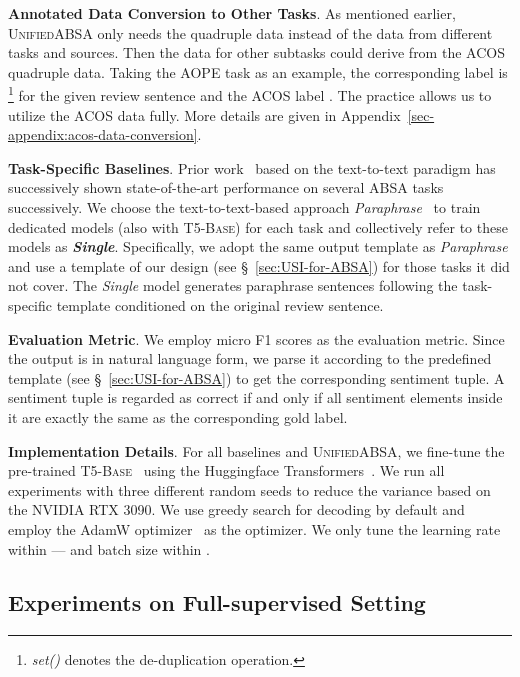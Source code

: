 \documentclass[11pt]{article}
\newcommand{\UnifiedABSA}{\textsc{UnifiedABSA}\xspace}
\newcommand{\single}{\textit{Single}\xspace}
\begin{document}
\noindent\textbf{Annotated Data Conversion to Other Tasks}. As mentioned earlier, \UnifiedABSA only needs the quadruple data instead of the data from different tasks and sources. Then the data for other subtasks could derive from the ACOS quadruple data. Taking the AOPE task as an example, the corresponding label is \footnote{\emph{set()} denotes the de-duplication operation.} for the given review sentence and the ACOS label . The practice allows us to utilize the ACOS data fully. More details are given in Appendix~\ref{sec-appendix:acos-data-conversion}.



\noindent\textbf{Task-Specific Baselines}. Prior work~\cite{zhang-etal-2021-gas,zhang-etal-2021-paraphrase} based on the text-to-text paradigm has successively shown state-of-the-art performance on several ABSA tasks successively. We choose the text-to-text-based approach \emph{Paraphrase}~\cite{zhang-etal-2021-paraphrase} to train dedicated models (also with \textsc{T5-Base}) for each task and  collectively refer to these models as \textbf{\single}. Specifically, we adopt the same output template as \emph{Paraphrase} and use a template of our design (see \S~\ref{sec:USI-for-ABSA}) for those tasks it did not cover. The \single model generates paraphrase sentences following the task-specific template conditioned on the original review sentence.



\noindent\textbf{Evaluation Metric}. We employ micro F1 scores as the evaluation metric. Since the output is in natural language form, we parse it according to the predefined template (see \S~\ref{sec:USI-for-ABSA}) to get the corresponding sentiment tuple. A sentiment tuple is regarded as correct if and only if all sentiment elements inside it are exactly the same as the corresponding gold label. 



\noindent\textbf{Implementation Details}. For all baselines and \UnifiedABSA, we fine-tune the pre-trained \textsc{T5-Base}~\citep{raffel2020t5} using the Huggingface Transformers~\citep{wolf-etal-2020-transformers}. We run all experiments with three different random seeds to reduce the variance based on the NVIDIA RTX 3090. We use greedy search for decoding by default and employ the AdamW optimizer~\citep{DBLP:conf/iclr/LoshchilovH19} as the optimizer. We only tune the learning rate within --- and batch size within . 




\subsection{Experiments on Full-supervised Setting}
\label{sec:full-data-exp}
\end{document}
